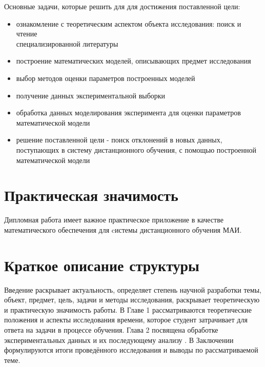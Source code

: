 Основные задачи, которые решить для для достижения поставленной цели:
\begin{itemize}
\item ознакомление с теоретическим аспектом объекта исследования: поиск и чтение \\специализированной литературы
\item построение математических моделей, описывающих предмет исследо\-вания
\item выбор методов оценки параметров построенных моделей
\item получение данных экспериментальной выборки
\item обработка данных моделирования эксперимента для оценки параметров \\математической модели
\item решение поставленной цели - поиск отклонений в  новых данных, поступа\-ющих в систему дистанционного обучения, с помощью построенной мате\-матической модели
\end{itemize}


\section{Практическая значимость}

Дипломная работа имеет важное практическое приложение в качестве математического обеспечения для cистемы дистанционного обучения МАИ.

\section{Краткое описание структуры}

Введение раскрывает актуальность, определяет степень научной разра\-ботки темы, объект, предмет,  цель, задачи и методы исследования, раскрывает теоре\-тическую и прак\-тическую значимость работы.
В Главе 1 рассматриваются теоретические положения и аспекты исследования времени, которое студент затрачивает для ответа на задачи в процес\-се обучения.
Глава 2 посвящена обработке экспериментальных данных и их последую\-щему анализу .
В Заключе\-нии формулируются итоги проведённого исследования и выводы по рассматри\-ваемой теме.